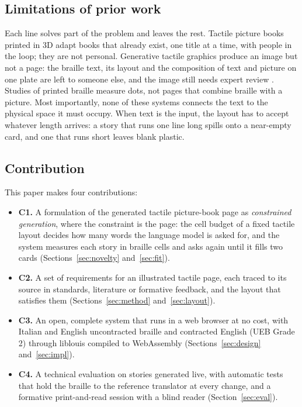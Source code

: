 \documentclass[conference]{IEEEtran}
\begin{document}
\subsection{Limitations of prior work}

Each line solves part of the problem and leaves the rest. Tactile picture books printed in 3D adapt books that already exist, one title at a time, with people in the loop; they are not personal. Generative tactile graphics produce an image but not a page: the braille text, its layout and the composition of text and picture on one plate are left to someone else, and the image still needs expert review \cite{tanaka2025}. Studies of printed braille measure dots, not pages that combine braille with a picture. Most importantly, none of these systems connects the text to the physical space it must occupy. When text is the input, the layout has to accept whatever length arrives: a story that runs one line long spills onto a near-empty card, and one that runs short leaves blank plastic.

\subsection{Contribution}

This paper makes four contributions:
\begin{itemize}
\item \textbf{C1.} A formulation of the generated tactile picture-book page as \emph{constrained generation}, where the constraint is the page: the cell budget of a fixed tactile layout decides how many words the language model is asked for, and the system measures each story in braille cells and asks again until it fills two cards (Sections~\ref{sec:novelty} and~\ref{sec:fit}).
\item \textbf{C2.} A set of requirements for an illustrated tactile page, each traced to its source in standards, literature or formative feedback, and the layout that satisfies them (Sections~\ref{sec:method} and~\ref{sec:layout}).
\item \textbf{C3.} An open, complete system that runs in a web browser at no cost, with Italian and English uncontracted braille and contracted English (UEB Grade 2) through liblouis compiled to WebAssembly (Sections~\ref{sec:design} and~\ref{sec:impl}).
\item \textbf{C4.} A technical evaluation on stories generated live, with automatic tests that hold the braille to the reference translator at every change, and a formative print-and-read session with a blind reader (Section~\ref{sec:eval}).
\end{itemize}
\end{document}
